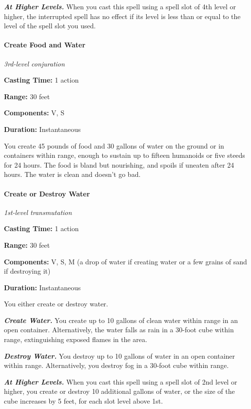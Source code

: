 \documentclass[
]{article}
\begin{document}
\emph{\textbf{At Higher Levels.}} When you cast this spell using a spell
slot of 4th level or higher, the interrupted spell has no effect if its
level is less than or equal to the level of the spell slot you used.

\hypertarget{create-food-and-water}{%
\paragraph{Create Food and Water}\label{create-food-and-water}}

\emph{3rd-level conjuration}

\textbf{Casting Time:} 1 action

\textbf{Range:} 30 feet

\textbf{Components:} V, S

\textbf{Duration:} Instantaneous

You create 45 pounds of food and 30 gallons of water on the ground or in
containers within range, enough to sustain up to fifteen humanoids or
five steeds for 24 hours. The food is bland but nourishing, and spoils
if uneaten after 24 hours. The water is clean and doesn't go bad.

\hypertarget{create-or-destroy-water}{%
\paragraph{Create or Destroy Water}\label{create-or-destroy-water}}

\emph{1st-level transmutation}

\textbf{Casting Time:} 1 action

\textbf{Range:} 30 feet

\textbf{Components:} V, S, M (a drop of water if creating water or a few
grains of sand if destroying it)

\textbf{Duration:} Instantaneous

You either create or destroy water.

\emph{\textbf{Create Water.}} You create up to 10 gallons of clean water
within range in an open container. Alternatively, the water falls as
rain in a 30-foot cube within range, extinguishing exposed flames in the
area.

\emph{\textbf{Destroy Water.}} You destroy up to 10 gallons of water in
an open container within range. Alternatively, you destroy fog in a
30-foot cube within range.

\emph{\textbf{At Higher Levels.}} When you cast this spell using a spell
slot of 2nd level or higher, you create or destroy 10 additional gallons
of water, or the size of the cube increases by 5 feet, for each slot
level above 1st.
\end{document}
